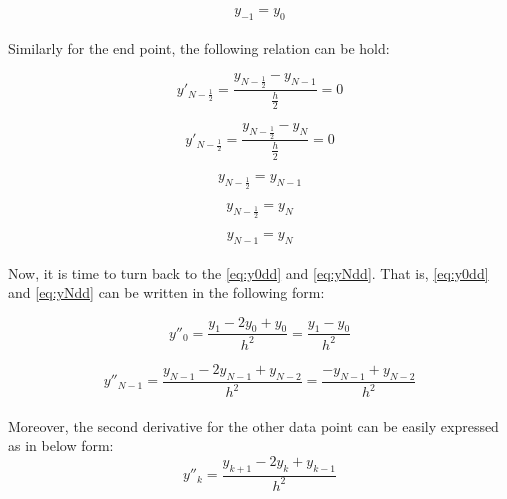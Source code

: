 \documentclass[letterpaper,12pt]{article}
\begin{document}
\begin{equation*}
    \boxed{y_{-1} = y_{0}}
\end{equation*}

\paragraph{} Similarly for the end point, the following relation can be hold:

\begin{equation*}
    y'_{N-\frac{1}{2}} = \frac{y_{N-\frac{1}{2}} - y_{N-1}}{\frac{h}{2}} = 0
\end{equation*}

\begin{equation*}
    y'_{N-\frac{1}{2}} = \frac{y_{N-\frac{1}{2}} - y_{N}}{\frac{h}{2}} = 0
\end{equation*}

\begin{equation*}
    y_{N-\frac{1}{2}} = y_{N-1}
\end{equation*}

\begin{equation*}
    y_{N-\frac{1}{2}} = y_{N}
\end{equation*}

\begin{equation*}
    \boxed{y_{N-1} = y_{N}}
\end{equation*}


\paragraph{} Now, it is time to turn back to the \eqref{eq:y0dd} and \eqref{eq:yNdd}. That is, \eqref{eq:y0dd} and \eqref{eq:yNdd} can be written in the following form:

\begin{equation*}
    y''_0 = \frac{y_1 -2y_0+y_{0}}{h^2} = \frac{y_1 - y_{0}}{h^2}
\end{equation*}

\begin{equation*}
y''_{N-1} = \frac{y_{N-1} -2y_{N-1}+y_{N-2}}{h^2} = \frac{-y_{N-1}+y_{N-2}}{h^2}
\end{equation*}

\paragraph{} Moreover, the second derivative for the other data point can be easily expressed as in below form:
\begin{equation*}
    \label{eq:gendd}
    y''_k = \frac{y_{k+1} -2y_k + y_{k-1}}{h^2}
\end{equation*}
\end{document}
